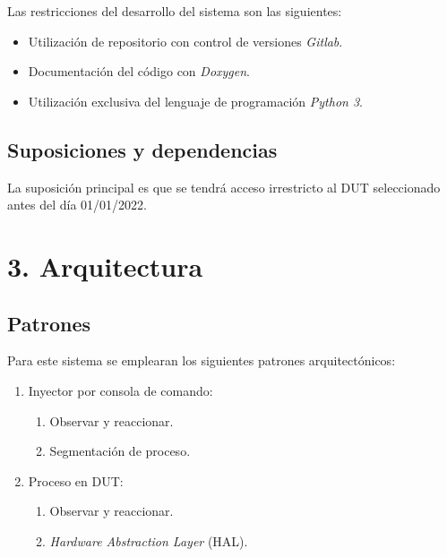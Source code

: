 \documentclass[
11pt, %
codirector, %
]{charter}
\begin{document}
Las restricciones del desarrollo del sistema son las siguientes:

\begin{itemize}
	\item Utilización de repositorio con control de versiones \emph{Gitlab}.
	\item Documentación del código con \emph{Doxygen}.
	\item Utilización exclusiva del lenguaje de programación \emph{Python 3}.
\end{itemize}

\subsection{Suposiciones y dependencias}
\label{sub:suposiciones}

La suposición principal es que se tendrá acceso irrestricto al DUT seleccionado antes del día 01/01/2022.

\section{3. Arquitectura}
\label{sec:arq}

\subsection{Patrones}
\label{sub:pat}

Para este sistema se emplearan los siguientes patrones arquitectónicos:

\begin{enumerate}
	\item Inyector por consola de comando:
		\begin{enumerate}
			\item Observar y reaccionar.
			\item Segmentación de proceso.
		\end{enumerate}
	\item Proceso en DUT:
		\begin{enumerate}
			\item Observar y reaccionar.
			\item \emph{Hardware Abstraction Layer} (HAL).
		\end{enumerate}
\end{enumerate}
\end{document}
